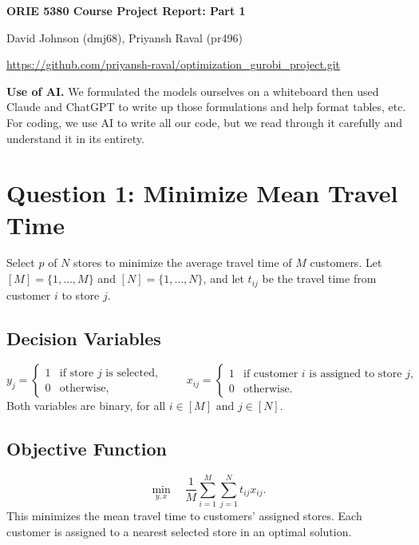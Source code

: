 \documentclass{article}
\begin{document}
\begin{center}
{\Large\bfseries ORIE 5380 Course Project Report: Part 1 \par}
\vspace{1.2em}
{\normalsize David Johnson (dmj68), Priyansh Raval (pr496) \par}
\vspace{0.4em}
{\small\url{https://github.com/priyansh-raval/optimization_gurobi_project.git} \par}
\vspace{2em}
\end{center}

\textbf{Use of AI.} 
We formulated the models ourselves on a whiteboard then used Claude and ChatGPT to write up those formulations and help format tables, etc. For coding, we use AI to write all our code, but we read through it carefully and understand it in its entirety.

\section*{Question 1: Minimize Mean Travel Time}

Select $p$ of $N$ stores to minimize the average travel time of $M$ customers.
Let $[M]=\{1,\ldots,M\}$ and $[N]=\{1,\ldots,N\}$, and let $t_{ij}$ be the travel time from customer $i$ to store $j$.

\subsection*{Decision Variables}
\[
y_j = \begin{cases}
1 & \text{if store $j$ is selected},\\
0 & \text{otherwise},
\end{cases}
\qquad
x_{ij} = \begin{cases}
1 & \text{if customer $i$ is assigned to store $j$},\\
0 & \text{otherwise}.
\end{cases}
\]
Both variables are binary, for all $i\in[M]$ and $j\in[N]$.

\subsection*{Objective Function}
\begin{equation}
\min_{y,x}\quad \frac{1}{M}\sum_{i=1}^{M}\sum_{j=1}^{N}t_{ij}x_{ij}.
\label{eq:mean-obj}
\end{equation}
This minimizes the mean travel time to customers' assigned stores. Each customer is
assigned to a nearest selected store in an optimal solution.
\end{document}
